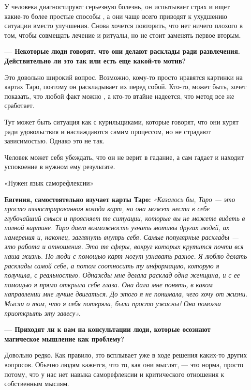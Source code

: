 У человека диагностируют серьезную болезнь, он испытывает страх и ищет какие-то более простые способы , а они чаще всего приводят к ухудшению ситуации вместо улучшения. Снова хочется повторить, что нет ничего плохого в том, чтобы совмещать лечение и ритуалы, но не стоит заменять первое вторым.

\textbf{--- Некоторые люди говорят, что они делают расклады ради развлечения. Действительно ли это так или есть еще какой-то мотив?}

Это довольно широкий вопрос. Возможно, кому-то просто нравятся картинки на картах Таро, поэтому он раскладывает их перед собой. Кто-то, может быть, хочет показать, что любой факт можно , а кто-то втайне надеется, что метод все же сработает.

Тут может быть ситуация как с курильщиками, которые говорят, что они курят ради удовольствия и наслаждаются самим процессом, но не страдают зависимостью. Однако это не так.

Человек может себя убеждать, что он не верит в гадание, а сам гадает и находит успокоение в нужном ему результате.

\vspace*{1em}
\begin{center}
    \Large «Нужен язык саморефлексии»
\end{center}
\vspace*{1em}

\textbf{Евгения, самостоятельно изучает карты Таро: } \textit{«Казалось бы, Таро — это просто иллюстрированная колода карт, но она может нести в себе глубочайший смысл и проясняет те ситуации, которые вы не можете видеть в полной картине. Таро дает возможность узнать мотивы других людей, их намерения и, наконец, заглянуть внутрь себя. Самые популярные расклады — это работа и отношения. Это те сферы, вокруг которых крутится почти вся наша жизнь. Но люди с помощью карт могут узнавать разное. Я люблю делать расклады самой себе, а потом соотносить ту информацию, которую я получила, с реальностью. Однажды мне делала расклад одна женщина, и с ее помощью я прямо открыла себе глаза. Она дала мне понять, в каком направлении мне лучше двигаться. До этого я не понимала, чего хочу от жизни. Мысли о том, что я себя потеряла, были просто ужасны! Она помогла приоткрыть эту завесу». }

\textbf{--- Приходят ли к вам на консультации люди, которые осознают магическое мышление как проблему?}

Довольно редко. Как правило, это всплывает уже в ходе решения каких-то других вопросов. Обычно людям кажется, что то, как они мыслят, — это норма, просто потому, что у нас нет навыка саморефлексии и критического отношения к собственным мыслям.

